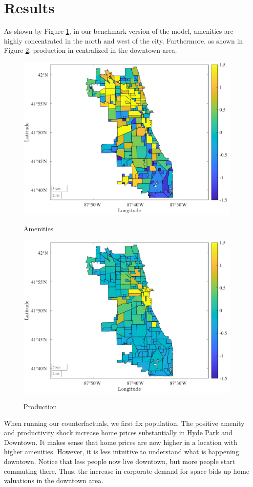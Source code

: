 \documentclass[12pt]{article}
\begin{document}
\section{Results}
As shown by Figure \ref{fig:amenities_base}, in our benchmark version of the model, amenities are highly concentrated in the north and west of the city. Furthermore, as shown in Figure \ref{fig:prod_base}, production in centralized in the downtown area.
\begin{figure}[h]
    \centering
    \caption{Amenities}
    \includegraphics[width=.75\textwidth]{Pset1/Figures/Single Agent/Baseline/eAmenities.pdf}
    \label{fig:amenities_base}
\end{figure}  
\begin{figure}[h]
    \centering
    \caption{Production}
    \includegraphics[width=.75\linewidth]{Pset1/Figures/Single Agent/Baseline/prod.pdf}
    \label{fig:prod_base}
\end{figure}
When running our counterfactuals, we first fix population. The positive amenity and productivity shock increase home prices substantially in Hyde Park and Downtown. It makes sense that home prices are now higher in a location with higher amenities. However, it is less intuitive to understand what is happening downtown. Notice that less people now live downtown, but more people start commuting there. Thus, the increase in corporate demand for space bids up home valuations in the downtown area. 
\end{document}
